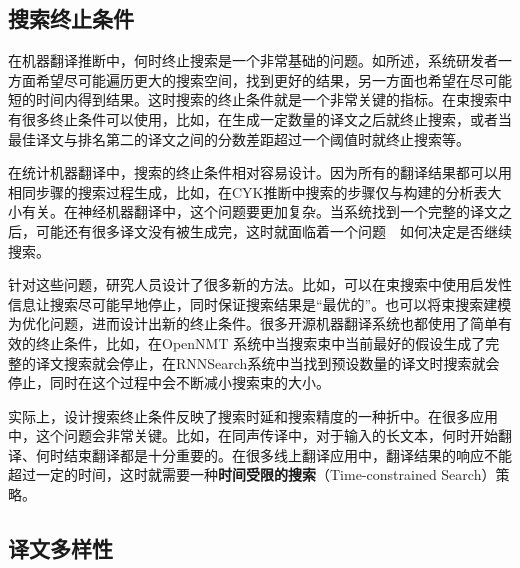 \subsection{搜索终止条件}

\parinterval 在机器翻译推断中，何时终止搜索是一个非常基础的问题。如{\chaptertwo}所述，系统研发者一方面希望尽可能遍历更大的搜索空间，找到更好的结果，另一方面也希望在尽可能短的时间内得到结果。这时搜索的终止条件就是一个非常关键的指标。在束搜索中有很多终止条件可以使用，比如，在生成一定数量的译文之后就终止搜索，或者当最佳译文与排名第二的译文之间的分数差距超过一个阈值时就终止搜索等。

\parinterval 在统计机器翻译中，搜索的终止条件相对容易设计。因为所有的翻译结果都可以用相同步骤的搜索过程生成，比如，在CYK推断中搜索的步骤仅与构建的分析表大小有关。在神经机器翻译中，这个问题要更加复杂。当系统找到一个完整的译文之后，可能还有很多译文没有被生成完，这时就面临着一个问题\ \dash \ 如何决定是否继续搜索。

\parinterval 针对这些问题，研究人员设计了很多新的方法。比如，可以在束搜索中使用启发性信息让搜索尽可能早地停止，同时保证搜索结果是“最优的”。也可以将束搜索建模为优化问题，进而设计出新的终止条件。很多开源机器翻译系统也都使用了简单有效的终止条件，比如，在OpenNMT 系统中当搜索束中当前最好的假设生成了完整的译文搜索就会停止，在RNNSearch系统中当找到预设数量的译文时搜索就会停止，同时在这个过程中会不断减小搜索束的大小。

\parinterval 实际上，设计搜索终止条件反映了搜索时延和搜索精度的一种折中。在很多应用中，这个问题会非常关键。比如，在同声传译中，对于输入的长文本，何时开始翻译、何时结束翻译都是十分重要的。在很多线上翻译应用中，翻译结果的响应不能超过一定的时间，这时就需要一种{\small\sffamily\bfseries{时间受限的搜索}}（Time-constrained Search）策略。


\subsection{译文多样性}


